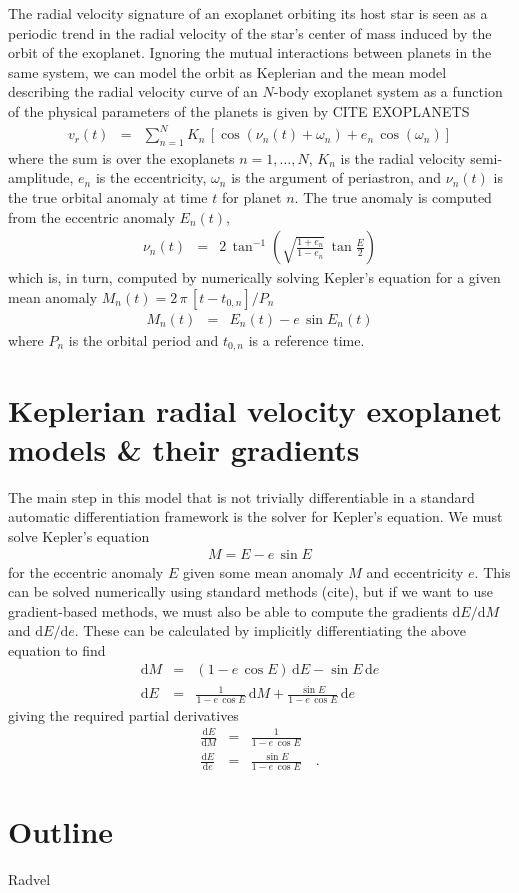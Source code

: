 \documentclass[modern]{aastex62}
\newcommand{\dd}{\ensuremath{ \mathrm{d}}}
\begin{document}
The radial velocity signature of an exoplanet orbiting its host star is seen
as a periodic trend in the radial velocity of the star's center of mass
induced by the orbit of the exoplanet.
Ignoring the mutual interactions between planets in the same system, we can
model the orbit as Keplerian and the mean model describing the radial velocity
curve of an $N$-body exoplanet system as a function of the physical parameters
of the planets is given by CITE EXOPLANETS \citep{Fulton:2018}
\begin{eqnarray}
v_r(t) &=& \sum_{n=1}^N K_n\,\left[ \cos(\nu_n(t)+\omega_n)
    + e_n\,\cos(\omega_n) \right]
\end{eqnarray}
where the sum is over the exoplanets $n=1,\ldots,N$, $K_n$ is the radial
velocity semi-amplitude, $e_n$ is the eccentricity, $\omega_n$ is the argument
of periastron, and $\nu_n(t)$ is the true orbital anomaly at time $t$ for
planet $n$.
The true anomaly is computed from the eccentric anomaly $E_n(t)$,
\begin{eqnarray}
\nu_n(t) &=& 2\,\tan^{-1}\left(\sqrt{\frac{1+e_n}{1-e_n}}\,
    \tan \frac{E}{2}\right)
\end{eqnarray}
which is, in turn, computed by numerically solving Kepler's equation for a
given mean anomaly $M_n(t) = 2\,\pi\,[t-t_{0,n}]/P_n$
\begin{eqnarray}
M_n(t) &=& E_n(t) - e \, \sin E_n(t)
\end{eqnarray}
where $P_n$ is the orbital period and $t_{0,n}$ is a reference time.

\section{Keplerian radial velocity exoplanet models \& their gradients}

The main step in this model that is not trivially differentiable in a standard
automatic differentiation framework is the solver for Kepler's equation.
We must solve Kepler's equation
\begin{eqnarray}
M = E - e\,\sin E
\end{eqnarray}
for the eccentric anomaly $E$ given some mean anomaly $M$ and eccentricity
$e$.
This can be solved numerically using standard methods (cite), but if we want
to use gradient-based methods, we must also be able to compute the gradients
$\dd E / \dd M$ and $\dd E / \dd e$.
These can be calculated by implicitly differentiating the above equation to
find
\begin{eqnarray}
\dd M &=& (1 - e\,\cos E)\,\dd E - \sin E \, \dd e \\
\dd E &=& \frac{1}{1 - e\,\cos E}\,\dd M + \frac{\sin E}{1 - e\,\cos E}\,\dd e
\end{eqnarray}
giving the required partial derivatives
\begin{eqnarray}
\frac{\dd E}{\dd M} &=& \frac{1}{1 - e\,\cos E} \\
\frac{\dd E}{\dd e} &=& \frac{\sin E}{1 - e\,\cos E} \quad.
\end{eqnarray}

\section{Outline}

Radvel \citep{Fulton:2018}



\end{document}

